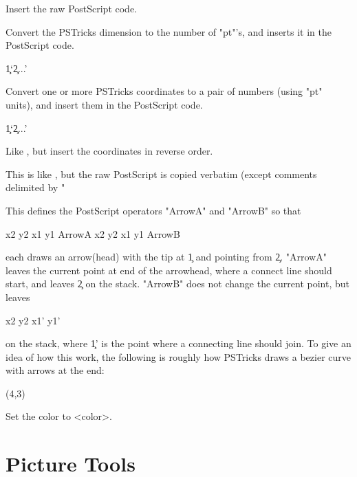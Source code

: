 \begin{description}

\mitem  {}
  Insert the raw PostScript code.

\mitem  {}

  Convert the PSTricks dimension to the number of "pt"'s, and inserts it in
the PostScript code.

\mitem  \coor\c1`\c2...\cn'

Convert one or more PSTricks coordinates to a pair of numbers (using "pt"
units), and insert them in the PostScript code.

\mitem  \rcoor\c1`\c2...\cn'

Like \n\coor, but insert the coordinates in reverse order.

\mitem  {}

  This is like \n\code, but the raw PostScript is copied verbatim (except
comments delimited by "%

\mitem  {}

  This defines the PostScript operators "ArrowA" and "ArrowB" so that
\begin{LVerb}
  x2 y2 x1 y1 ArrowA
  x2 y2 x1 y1 ArrowB
\end{LVerb}
each draws an arrow(head) with the tip at \c1 and pointing from \c2. "ArrowA"
leaves the current point at end of the arrowhead, where a connect line should
start, and leaves \c2 on the stack. "ArrowB" does not change the current
point, but leaves
\begin{LVerb}
  x2 y2 x1' y1'
\end{LVerb}
on the stack, where \c{1'} is the point where a connecting line should join.
To give an idea of how this work, the following is roughly how PSTricks draws
a bezier curve with arrows at the end:
\begin{MEx*}(4,3)
\end{MEx*}

\mitem  {}

  Set the color to <color>.

\end{description}


\part{Picture Tools\label{P-pictures}}


